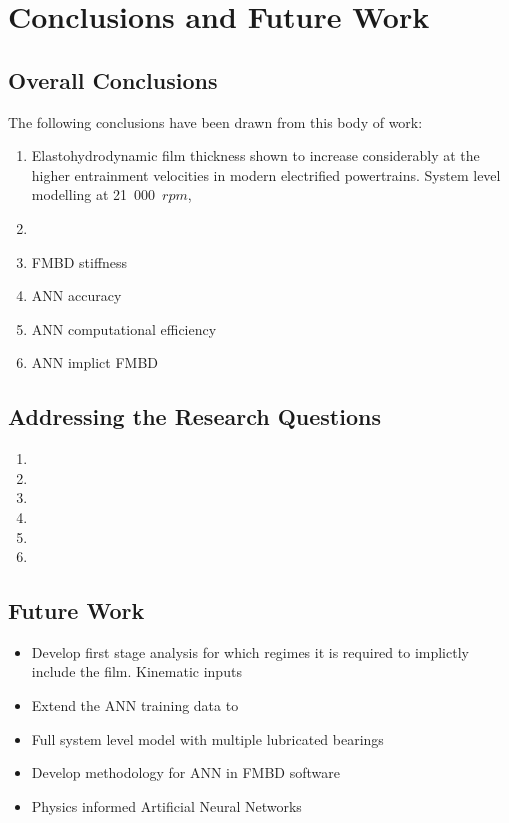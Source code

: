 \chapter{Conclusions and Future Work}
\label{Conclusions}

\section{Overall Conclusions}

The following conclusions have been drawn from this body of work:

\begin{enumerate}
	\item Elastohydrodynamic film thickness shown to increase considerably at the higher entrainment velocities in modern electrified powertrains. System level modelling at 21~000~$rpm$, 
	\item 
	\item FMBD stiffness
	\item ANN accuracy
	\item ANN computational efficiency
	\item ANN implict FMBD
\end{enumerate}


\section{Addressing the Research Questions}

\begin{enumerate}
	\item 
	\item 
	\item 
	\item 
	\item 
	\item	
\end{enumerate}


\section{Future Work}

\begin{itemize}
	\item Develop first stage analysis for which regimes it is required to implictly include the film. Kinematic inputs
	\item Extend the ANN training data to 
	\item Full system level model with multiple lubricated bearings
	\item Develop methodology for ANN in FMBD software
	\item Physics informed Artificial Neural Networks
\end{itemize}